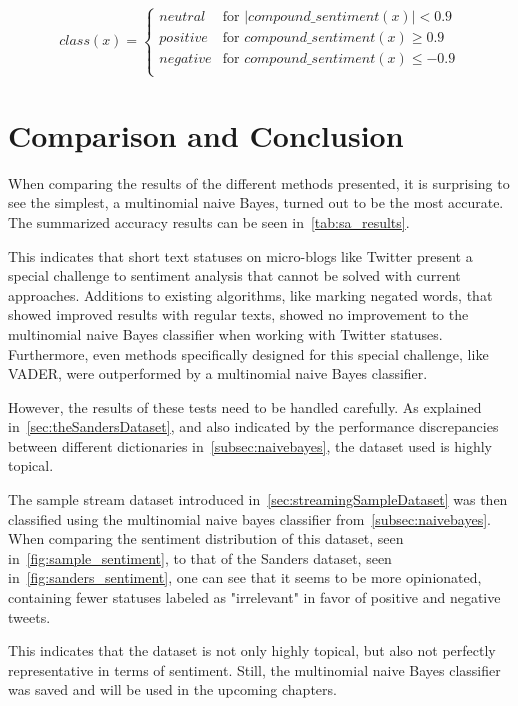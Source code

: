 \begin{equation}
    class(x) =
    \begin{cases}
        neutral & \text{for } |compound\_sentiment(x)| < 0.9 \\
        positive & \text{for } compound\_sentiment(x) \geq 0.9 \\
        negative & \text{for } compound\_sentiment(x) \leq -0.9 \\
    \end{cases}
\end{equation}

\section{Comparison and Conclusion}
\label{sec:comparison}

When comparing the results of the different methods presented, it is surprising to see the simplest,
a multinomial naive Bayes, turned out to be the most accurate.
The summarized accuracy results can be seen in~\cref{tab:sa_results}.


This indicates that short text statuses on micro-blogs like Twitter present a special challenge to sentiment analysis
that cannot be solved with current approaches.
Additions to existing algorithms, like marking negated words, that showed improved results with regular texts,
showed no improvement to the multinomial naive Bayes classifier when working with Twitter statuses.
Furthermore, even methods specifically designed for this special challenge, like VADER,
were outperformed by a multinomial naive Bayes classifier.

However, the results of these tests need to be handled carefully.
As explained in~\cref{sec:theSandersDataset},
and also indicated by the performance discrepancies between different dictionaries in~\cref{subsec:naivebayes},
the dataset used is highly topical.

The sample stream dataset introduced in~\cref{sec:streamingSampleDataset} was then classified using the multinomial naive bayes classifier from~\cref{subsec:naivebayes}.
When comparing the sentiment distribution of this dataset, seen in~\cref{fig:sample_sentiment},
to that of the Sanders dataset, seen in~\cref{fig:sanders_sentiment},
one can see that it seems to be more opinionated,
containing fewer statuses labeled as "irrelevant" in favor of positive and negative tweets.

This indicates that the dataset is not only highly topical, but also not perfectly representative in terms of sentiment.
Still, the multinomial naive Bayes classifier was saved and will be used in the upcoming chapters.


